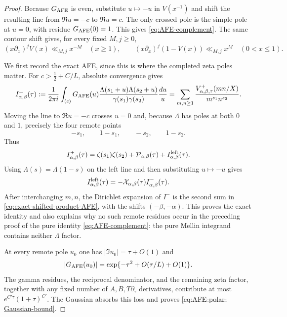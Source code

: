 \begin{proof}
Because $G_{\rm AFE}$ is even, substitute $u\mapsto-u$ in
$V(x^{-1})$ and shift the resulting line from $\Re u=-c$ to $\Re u=c$.
The only crossed pole is the simple pole at $u=0$, with residue
 $G_{\rm AFE}(0)=1$.  This gives \eqref{eq:AFE-complement}.  The same contour
shift gives, for every fixed $M,j\ge0$,
\[
(x\partial_x)^jV(x)\ll_{M,j}x^{-M}\quad(x\ge1),
\qquad
(x\partial_x)^j(1-V(x))\ll_{M,j}x^M\quad(0<x\le1).
\]

We first record the exact AFE, since this is where the completed zeta poles
matter.  For $c>\frac12+C/L$, absolute convergence gives
\[
I^+_{\alpha,\beta}(\tau)
:=\frac1{2\pi i}\int_{(c)}G_{\rm AFE}(u)
 \frac{\Lambda(s_1+u)\Lambda(s_2+u)}
 {\gamma(s_1)\gamma(s_2)}\frac{du}{u}
=\sum_{m,n\ge1}\frac{V^+_{\alpha,\beta,\tau}(mn/X)}
 {m^{s_1}n^{s_2}}.
\]
Moving the line to $\Re u=-c$ crosses $u=0$ and, because $\Lambda$ has poles
at both $0$ and $1$, precisely the four remote points
\[
-s_1,\qquad 1-s_1,\qquad -s_2,\qquad 1-s_2.
\]
Thus
\[
I^+_{\alpha,\beta}(\tau)
=\zeta(s_1)\zeta(s_2)+\mathcal P_{\alpha,\beta}(\tau)
 +I^{\rm left}_{\alpha,\beta}(\tau).
\]
Using $\Lambda(s)=\Lambda(1-s)$ on the left line and then substituting
$u\mapsto-u$ gives
\[
I^{\rm left}_{\alpha,\beta}(\tau)
=-\mathcal X_{\alpha,\beta}(\tau)I^-_{\alpha,\beta}(\tau).
\]
After interchanging $m,n$, the Dirichlet expansion of $I^-$ is the second sum
in \eqref{eq:exact-shifted-product-AFE}, with the shifts
$(-\beta,-\alpha)$.  This proves the exact identity and also explains why no
such remote residues occur in the preceding proof of the pure identity
\eqref{eq:AFE-complement}: the pure Mellin integrand contains neither
$\Lambda$ factor.

At every remote pole $u_0$ one has $|\Im u_0|=\tau+O(1)$ and
\[
|G_{\rm AFE}(u_0)|
=\exp\{-\tau^2+O(\tau/L)+O(1)\}.
\]
The gamma residues, the reciprocal denominator, and the remaining zeta factor,
together with any fixed number of $A,B,T\partial_\tau$ derivatives, contribute
at most $e^{C'\tau}(1+\tau)^{C'}$.  The Gaussian absorbs this loss and proves
\eqref{eq:AFE-polar-Gaussian-bound}.


\end{proof}
